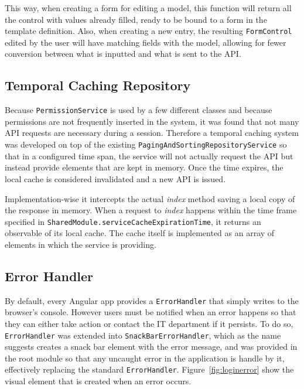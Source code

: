 This way, when creating a form for editing a model, this function will return all the control with values already filled, ready to be bound to a form in the template definition. Also, when creating a new entry, the resulting \texttt{FormControl} edited by the user will have matching fields with the model, allowing for fewer conversion between what is inputted and what is sent to the \gls{API}.

\subsection{Temporal Caching Repository}\label{tcr}
Because \texttt{PermissionService} is used by a few different classes and because permissions are not frequently inserted in the system, it was found that not many \gls{API} requests are necessary during a session. Therefore a temporal caching system was developed on top of the existing \texttt{PagingAndSortingRepositoryService} so that in a configured time span, the service will not actually request the \gls{API} but instead provide elements that are kept in memory. Once the time expires, the local cache is considered invalidated and a new \gls{API} is issued.

Implementation-wise it intercepts the actual \textit{index} method saving a local copy of the response in memory. When a request to \textit{index} happens within the time frame specified in \texttt{SharedModule.serviceCacheExpirationTime}, it returns an observable of its local cache. The cache itself is implemented as an array of elements in which the service is providing.

\subsection{Error Handler}\label{error:handler}
By default, every Angular app provides a \texttt{ErrorHandler} that simply writes to the browser's console. However users must be notified when an error happens so that they can either take action or contact the IT department if it persists. To do so, \texttt{ErrorHandler} was extended into \texttt{SnackBarErrorHandler}, which as the name suggests creates a snack bar element with the error message, and was provided in the root module so that any uncaught error in the application is handle by it, effectively replacing the standard \texttt{ErrorHandler}. Figure~\ref{fig:loginerror} show the visual element that is created when an error occurs.

